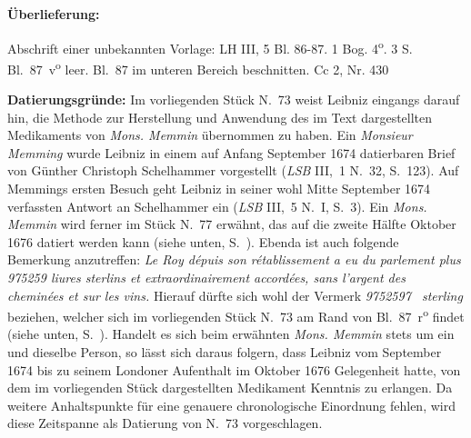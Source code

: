 \begin{ledgroupsized}[r]{120mm}%
\footnotesize%
\pstart%
\noindent%
\textbf{\"{U}berlieferung:}%
\pend%
\end{ledgroupsized}%
\begin{ledgroupsized}[r]{114mm}%
\footnotesize%
\pstart%
\parindent -6mm%
%
Abschrift einer unbekannten Vorlage:
LH III, 5 Bl. 86-87.
1 Bog. 4\textsuperscript{o}.
3 S. Bl.~87~v\textsuperscript{o} leer.
Bl.~87 im unteren Bereich beschnitten.%
\newline%
Cc 2, Nr. 430%
\pend%
\end{ledgroupsized}%
%
\vspace{8mm}%
\begin{ledgroup}%
\footnotesize%
\pstart%
\noindent%
\footnotesize{%
\textbf{Datierungsgr\"{u}nde:}
Im vorliegenden Stück N.~73 %
weist Leibniz eingangs darauf hin,
die Methode zur Herstellung und Anwendung des im Text dargestellten Medikaments von \textit{Mons. Memmin} übernommen zu haben.
Ein \textit{Monsieur Memming} wurde Leibniz in einem auf Anfang September 1674 datierbaren Brief von Günther Christoph Schelhammer vorgestellt (\textit{LSB} III,~1 N.~32, S.~123).
Auf Memmings ersten Besuch geht Leibniz in seiner wohl Mitte September 1674 verfassten Antwort an Schelhammer ein (\textit{LSB} III,~5 N.~I, S.~3).
Ein \textit{Mons. Memmin} wird ferner im Stück N.~77 %
erwähnt, das auf die zweite Hälfte Oktober 1676 datiert werden kann (siehe unten, S.~\pageref{LH041,02_009r_Memmin}).
Ebenda ist auch folgende Bemerkung anzutreffen:
\textit{Le Roy dépuis son rétablissement a eu du parlement plus 975259 liures sterlins et extraordinairement accordées, sans l'argent des cheminées et sur les vins.}
Hierauf dürfte sich wohl der Vermerk \textit{9752597 \Pfund\ sterling} beziehen, welcher sich im vorliegenden Stück N.~73 %
am Rand von Bl.~87~r\textsuperscript{o} findet (siehe unten, S.~\pageref{LH003,05_087r_sterling}).
Handelt es sich beim erwähnten \textit{Mons. Memmin} stets um ein und dieselbe Person, so lässt sich daraus folgern,
dass Leibniz vom September 1674 bis zu seinem Londoner Aufenthalt im Oktober 1676 Gelegenheit hatte,
von dem im vorliegenden Stück dargestellten Medikament Kenntnis zu erlangen.
Da weitere Anhalts\-punk\-te für eine genauere chronologische Einordnung fehlen,
wird diese Zeitspanne als Datierung von N.~73 %
vorgeschlagen.}%
\pend%
\end{ledgroup}%
